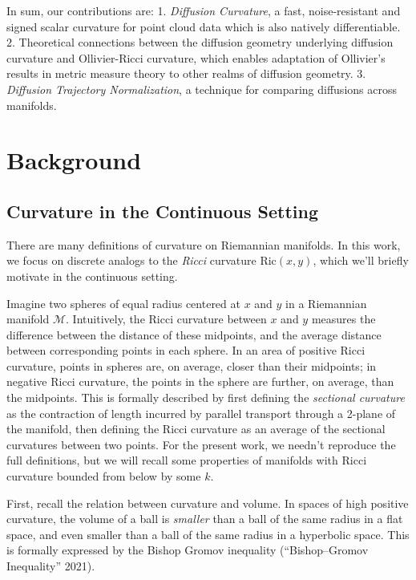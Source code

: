 \documentclass[
  letterpaper,
  DIV=11,
  numbers=noendperiod]{scrartcl}
\theoremstyle{plain}
\theoremstyle{definition}
\theoremstyle{plain}
\theoremstyle{definition}
\theoremstyle{plain}
\theoremstyle{remark}
\begin{document}
In sum, our contributions are: 1. \emph{Diffusion Curvature}, a fast,
noise-resistant and signed scalar curvature for point cloud data which
is also natively differentiable. 2. Theoretical connections between the
diffusion geometry underlying diffusion curvature and Ollivier-Ricci
curvature, which enables adaptation of Ollivier's results in metric
measure theory to other realms of diffusion geometry. 3. \emph{Diffusion
Trajectory Normalization}, a technique for comparing diffusions across
manifolds.

\section{Background}\label{background}

\subsection{Curvature in the Continuous
Setting}\label{curvature-in-the-continuous-setting}

There are many definitions of curvature on Riemannian manifolds. In this
work, we focus on discrete analogs to the \emph{Ricci} curvature
\(\text{Ric}(x,y)\), which we'll briefly motivate in the continuous
setting.

Imagine two spheres of equal radius centered at \(x\) and \(y\) in a
Riemannian manifold \(\mathcal{M}\). Intuitively, the Ricci curvature
between \(x\) and \(y\) measures the difference between the distance of
these midpoints, and the average distance between corresponding points
in each sphere. In an area of positive Ricci curvature, points in
spheres are, on average, closer than their midpoints; in negative Ricci
curvature, the points in the sphere are further, on average, than the
midpoints. This is formally described by first defining the
\emph{sectional curvature} as the contraction of length incurred by
parallel transport through a 2-plane of the manifold, then defining the
Ricci curvature as an average of the sectional curvatures between two
points. For the present work, we needn't reproduce the full definitions,
but we will recall some properties of manifolds with Ricci curvature
bounded from below by some \(k\).

First, recall the relation between curvature and volume. In spaces of
high positive curvature, the volume of a ball is \emph{smaller} than a
ball of the same radius in a flat space, and even smaller than a ball of
the same radius in a hyperbolic space. This is formally expressed by the
Bishop Gromov inequality ({``Bishop--{Gromov} Inequality''} 2021).
\end{document}
